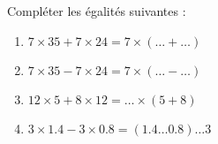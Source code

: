 
\begin{exercice}\label{exosmath-0739}

    Compléter les égalités suivantes :
    \begin{enumerate}
        \item
            \( 7\times 35+7\times 24=7\times(\ldots +\ldots)\)
        \item
            \( 7\times 35-7\times 24=7\times(\ldots - \ldots)\)
        \item
            \( 12\times 5+8\times 12 = \ldots\times (5+8) \)
        \item
            \( 3\times 1.4-3\times 0.8=(1.4\ldots 0.8)\ldots 3\)
    \end{enumerate}

\end{exercice}
